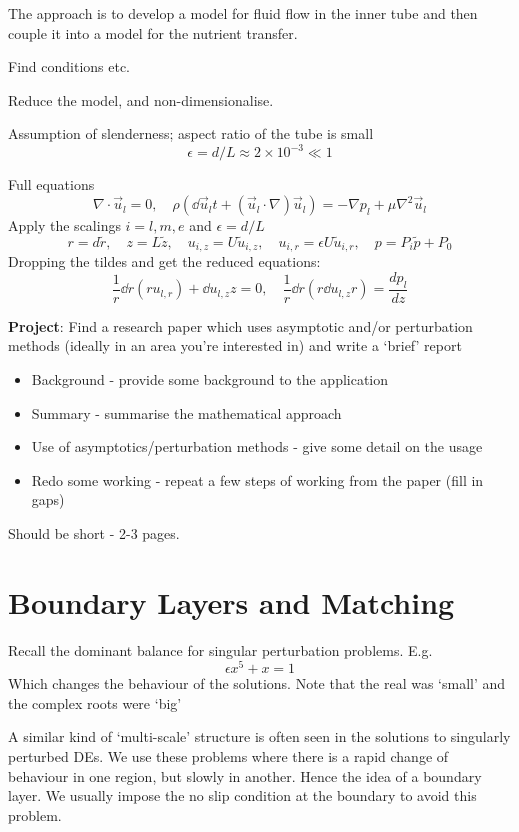 \documentclass{X:/Documents/Coding/Latex/myassignment}
\begin{document}
The approach is to develop a model for fluid flow in the inner tube and then couple it into a model for the nutrient transfer.

Find conditions etc.

Reduce the model, and non-dimensionalise.

Assumption of slenderness; aspect ratio of the tube is small
\[\epsilon = d/L \approx 2 \times 10^{-3} \ll 1\]

Full equations
    \[\nabla \cdot \vec u_l = 0, \quad \rho \left(\dd{\vec u_l}t + (\vec u_l \cdot \nabla )\vec u_l\right) = -\nabla p_l + \mu \nabla^2 \vec u_l\]
Apply the scalings $i = l,m,e$ and $\epsilon = d/L$
\[r = d\tilde{r}, \quad z= L \tilde{z}, \quad u_{i,z} = U \tilde{u}_{i,z},\quad u_{i,r} = \epsilon U \tilde{u}_{i,r}, \quad p = P_i \tilde{p} + P_0\]
Dropping the tildes and get the reduced equations:
\[\frac1r \dd{}r(r u_{l,r}) + \dd{u_{l,z}}{z}=0, \quad \frac1r \dd{}r(r \dd{u_{l,z}}r) = \frac{dp_l}{dz}\]




\textbf{Project}: 
Find a research paper which uses asymptotic and/or perturbation methods (ideally in an area you're interested in) and write a `brief' report
\begin{itemize}
    \item Background - provide some background to the application
    \item Summary - summarise the mathematical approach
    \item Use of asymptotics/perturbation methods - give some detail on the usage
    \item Redo some working - repeat a few steps of working from the paper (fill in gaps)
\end{itemize}
Should be short - 2-3 pages.




\section{Boundary Layers and Matching}
Recall the dominant balance for singular perturbation problems. E.g.
\[\epsilon x^5 + x =1\]
Which changes the behaviour of the solutions. Note that the real was `small' and the complex roots were `big'


A similar kind of `multi-scale' structure is often seen in the solutions to singularly perturbed DEs. We use these problems where there is a rapid change of behaviour in one region, but slowly in another. Hence the idea of a boundary layer. We usually impose the no slip condition at the boundary to avoid this problem.
\end{document}

